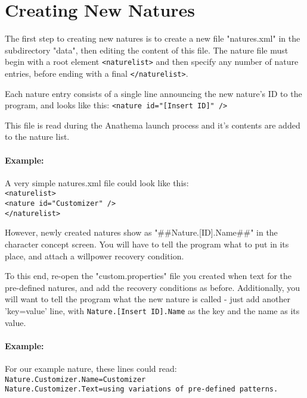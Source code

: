 \section{Creating New Natures}
The first step to creating new natures is to create a new file "natures.xml" in the subdirectory "data", then editing the content of this file. The nature file must begin with a root element \texttt{<naturelist>} and then specify any number of
nature entries, before ending with a final \texttt{</naturelist>}.

Each nature entry consists of a single line announcing the new nature's ID to the program, and looks like this:
\texttt{<nature id="[Insert ID]" />}

This file is read during the Anathema launch process and it's contents are added to the
nature list. 

\paragraph{Example:} A very simple natures.xml file could look like this:\\
\texttt{<naturelist>\\
	<nature id="Customizer" />\\
</naturelist>}


However, newly created natures show as "\#\#Nature.[ID].Name\#\#" in the character concept screen. You will have to tell the program what to put in its place, and attach a willpower recovery condition.

To this end, re-open the "custom.properties" file you created when text for the pre-defined natures, and add the recovery conditions as before. Additionally, you will want to tell the program what the new nature is called - just add another 'key=value' line, with \texttt{Nature.[Insert ID].Name} as the key and the name as its value.

\paragraph{Example:} For our example nature, these lines could read:\\
\texttt{Nature.Customizer.Name=Customizer\\
Nature.Customizer.Text=using variations of pre-defined patterns.}
